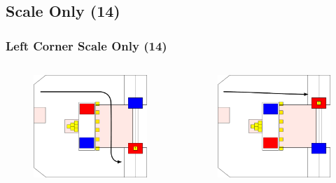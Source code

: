 \documentclass{beamer}
\begin{document}
\subsection{Scale Only (14)}

\begin{frame}
 \frametitle{Left Corner Scale Only \alert{(14)}}
 \begin{columns}
  \begin{figure}
   \includegraphics[scale=0.15]{assets/paths/14_LR}
  \end{figure}
  \begin{figure}
   \includegraphics[scale=0.15]{assets/paths/14_RL}

\end{figure}
\end{columns}
\end{frame}
\end{document}
